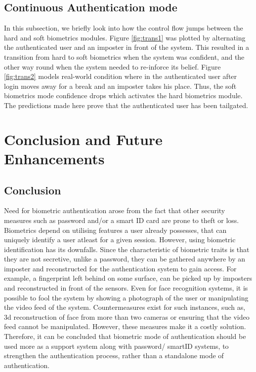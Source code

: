 \documentclass[12pt]{article}			%
\begin{document}
\subsection{Continuous Authentication mode}
\begin{figure}
	\centering
	\quad
\end{figure}
In this subsection, we briefly look into how the control flow jumps between the hard and soft biometrics modules.
Figure \ref{fig:trans1} was plotted by alternating the authenticated user and an imposter in front of the system.
This resulted in a transition from hard to soft biometrics when the system was confident, and the other way round when the system needed to re-inforce its belief.
Figure \ref{fig:trans2} models real-world condition where in the authenticated user after login moves away for a break and an imposter takes his place.
Thus, the soft biometrics mode confidence drops which activates the hard biometrics module.
The predictions made here prove that the authenticated user has been tailgated.

\newpage
\section{ Conclusion and Future Enhancements }
\subsection {Conclusion}
Need for biometric authentication arose from the fact that other security measures such as password and/or a smart ID card are prone to theft or loss. Biometrics depend on utilising features a user already possesses, that can uniquely identify a user atleast for a given session. However, using biometric identification has its downfalls. Since the characteristic of biometric traits is that they are not secretive, unlike a password, they can be gathered anywhere by an imposter and reconstructed for the authentication system to gain access. For example, a fingerprint left behind on some surface, can be picked up by imposters and reconstructed in front of the sensors. Even for face recognition systems, it is possible to fool the system by showing a photograph of the user or manipulating the video feed of the system. Countermeasures exist for such instances, such as, 3d reconstruction of face from more than two cameras or ensuring that the video feed cannot be manipulated. However, these measures make it a costly solution. Therefore, it can be concluded that biometric mode of authentication should be used more as a support system along with password/ smartID systems, to strengthen the authentication process, rather than a standalone mode of authentication.   
\end{document}

